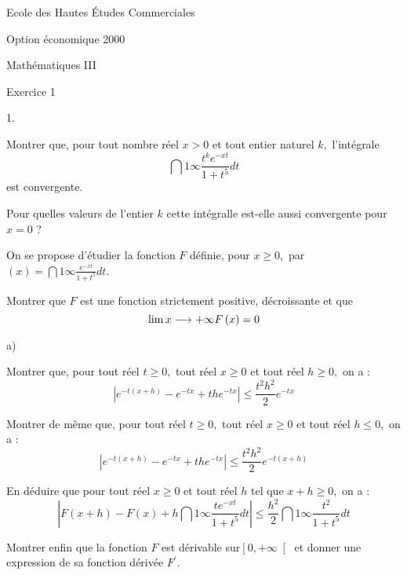 \documentclass[11pt]{article}%
\begin{document}
\begin{center}
{\LARGE Ecole des Hautes Études Commerciales }

{\Large Option économique 2000}

{\Large Mathématiques III}
\end{center}

{\LARGE Exercice 1}

\begin{noliste}{1.}
 \setlength{\itemsep}{4mm}
\item Montrer que, pour tout nombre réel $x>0$ et tout entier naturel
$k,$ l'intégrale 
\[
\dint{1}{\infty }\frac{t^{k}e^{-xt}}{1 + t^{5}}dt
\]
est convergente.

 
Pour quelles valeurs de l'entier $k$ cette intégralle est-elle aussi
convergente pour $x = 0$ ?


\item On se propose d'étudier la fonction $F$ définie, pour $x\geq 0,
$ par $\left( x\right) = \dint{1}{\infty }\frac{e^{-xt}}{1 + t^{5}}dt.$


Montrer que $F$ est une fonction strictement positive, décroissante et
que 
\[
\lim{x\longrightarrow + \infty }F\left( x\right) = 0
\]


\item 
\begin{noliste}{a)}
 \setlength{\itemsep}{2mm}
\item Montrer que, pour tout réel $t\geq 0,$ tout réel $x\geq 0$ et
tout réel $h\geq 0,$ on a : 
\[
\left| e^{-t(x + h)}-e^{-tx} + \left. t\right. \left. h\right.
e^{-tx}\right|
\leq \frac{t^{2}h^{2}}{2}e^{-tx}
\]


\item Montrer de même que, pour tout réel $t\geq 0,$ tout réel $x\geq
0$ et tout réel $h\leq 0,$ on a : 
\[
\left| e^{-t(x + h)}-e^{-tx} + \left. t\right. \left. h\right.
e^{-tx}\right|
\leq \frac{t^{2}h^{2}}{2}e^{-t(x + h)}
\]


\item En déduire que pour tout réel $x\geq 0$ et tout réel $h$
tel que $x + h\geq 0,$ on a : 
\[
\left| F(x + h)-F(x) + h\dint{1}{\infty }\frac{te^{-xt}}{1 +
t^{5}}dt\right| \leq 
\frac{h^{2}}{2}\dint{1}{\infty }\frac{t^{2}}{1 + t^{5}}dt
\]


\item Montrer enfin que la fonction $F$ est dérivable sur$\left[
0, + \infty \right[ $ et donner une expression de sa fonction dérivée
$F^{\prime }.$
\end{noliste}



\end{noliste}
\end{document}
